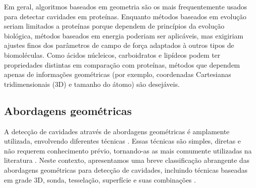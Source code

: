 \documentclass[Portugues]{phdquali}
\begin{document}
Em geral, algoritmos baseados em geometria são os mais frequentemente usados para detectar cavidades em proteínas. Enquanto métodos baseados em evolução seriam limitados a proteínas porque dependem de princípios da evolução biológica, métodos baseados em energia poderiam ser aplicáveis, mas exigiriam ajustes finos dos parâmetros de campo de força adaptados à outros tipos de biomoléculas. Como ácidos núcleicos, carboidratos e lipídeos podem ter propriedades distintas em comparação com proteínas, métodos que dependem apenas de informações geométricas (por exemplo, coordenadas Cartesianas tridimensionais (3D) e tamanho do átomo) são desejáveis.

\subsection{Abordagens geométricas \label{sec:geometric-approaches}}

A detecção de cavidades através de abordagens geométricas é amplamente utilizada, envolvendo diferentes técnicas \cite{simoes2017,guerra2020,krone2016}. Essas técnicas são simples, diretas e não requerem conhecimento prévio, tornando-as as mais comumente utilizadas na literatura \cite{henrich2010,oliveira2014}. Neste contexto, apresentamos uma breve classificação abrangente das abordagens geométricas para detecção de cavidades, incluindo técnicas baseadas em grade 3D, sonda, tesselação, superfície e suas combinações \cite{simoes2017,guerra2020,krone2016,guerra2023B}.
\end{document}
